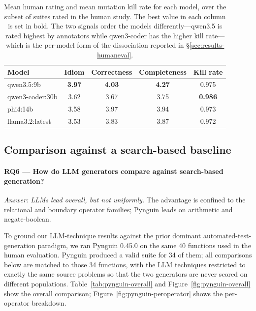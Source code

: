 \documentclass[smallextended]{svjour3}
\begin{document}
\begin{table}[t]
\centering
\caption{Mean human rating and mean mutation kill rate for each model,
over the subset of suites rated in the human study. The best value in each column is set in bold. The two signals
order the models differently---qwen3.5 is rated highest by annotators
while qwen3-coder has the higher kill rate---which is the per-model
form of the dissociation reported in
\S\ref{sec:results-humaneval}.}
\label{tab:humaneval-permodel}
\begin{tabular}{@{}lcccc@{}}
\toprule
Model & Idiom & Correctness & Completeness & Kill rate \\
\midrule
qwen3.5:9b & \textbf{3.97} & \textbf{4.03} & \textbf{4.27} & 0.975 \\
qwen3-coder:30b & 3.62 & 3.67 & 3.75 & \textbf{0.986} \\
phi4:14b & 3.58 & 3.97 & 3.94 & 0.973 \\
llama3.2:latest & 3.53 & 3.83 & 3.87 & 0.972 \\
\bottomrule
\end{tabular}
\end{table}

\subsection{Comparison against a search-based baseline}

\paragraph{\textnormal{\textbf{RQ6} --- How do LLM generators compare against search-based generation?}}
\emph{Answer: LLMs lead overall, but not uniformly.} The advantage
is confined to the relational and boundary operator families;
Pynguin leads on arithmetic and negate-boolean.

\label{sec:results-pynguin}

To ground our LLM-technique results against the prior dominant
automated-test-generation paradigm, we ran Pynguin 0.45.0
\citep{lukasczyk2022} on the same 40 functions used in the human
evaluation. Pynguin produced a valid suite for 34 of them; all
comparisons below are matched to those 34 functions, with the LLM
techniques restricted to exactly the same source problems so that the
two generators are never scored on different populations. Table~\ref{tab:pynguin-overall} and
Figure~\ref{fig:pynguin-overall} show the overall comparison;
Figure~\ref{fig:pynguin-peroperator} shows the per-operator
breakdown.
\end{document}
